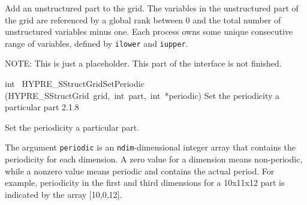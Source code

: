 \documentclass{article}
\begin{document}
\begin{cxxentry}
\begin{cxxentry}
\begin{cxxfunction}
\begin{cxxdoc}
Add an unstructured part to the grid.  The variables in the unstructured part
of the grid are referenced by a global rank between 0 and the total number of
unstructured variables minus one.  Each process owns some unique consecutive
range of variables, defined by {\tt ilower} and {\tt iupper}.

NOTE: This is just a placeholder.  This part of the interface is not finished.
\end{cxxdoc}
\end{cxxfunction}
\begin{cxxfunction}
{int\ }
        {HYPRE\_SStructGridSetPeriodic}
        {(HYPRE\_SStructGrid\ grid,\ int\ part,\ int\ *periodic)}
        {
Set the periodicity a particular part}
        {2.1.8}
\begin{cxxdoc}

Set the periodicity a particular part.

The argument {\tt periodic} is an {\tt ndim}-dimensional integer array that
contains the periodicity for each dimension.  A zero value for a dimension
means non-periodic, while a nonzero value means periodic and contains the
actual period.  For example, periodicity in the first and third dimensions
for a 10x11x12 part is indicated by the array [10,0,12].


\end{cxxdoc}
\end{cxxfunction}
\end{cxxentry}
\end{cxxentry}
\end{document}
